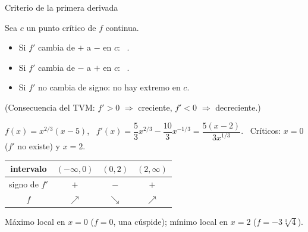 \documentclass[10pt,aspectratio=169]{beamer}
\begin{document}
\begin{frame}{Criterio de la primera derivada}
  \begin{teorema}
    Sea $c$ un punto crítico de $f$ continua.
    \begin{itemize}
      \item Si $f'$ cambia de $+$ a $-$ en $c$: \ .
      \item Si $f'$ cambia de $-$ a $+$ en $c$: \ .
      \item Si $f'$ no cambia de signo: no hay extremo en $c$.
    \end{itemize}
  \end{teorema}
  \small (Consecuencia del TVM: $f'>0$ $\Rightarrow$ creciente, $f'<0$ $\Rightarrow$ decreciente.)
  \normalsize
  \begin{ejemplo}[2]
    $f(x)=x^{2/3}(x-5)$, \ $f'(x)=\dfrac53x^{2/3}-\dfrac{10}{3}x^{-1/3}=\dfrac{5(x-2)}{3x^{1/3}}$. \ Críticos: $x=0$ ($f'$ no existe) y $x=2$.
    \begin{center}
      \begin{tabular}{c|ccc}
        intervalo & $(-\infty,0)$ & $(0,2)$ & $(2,\infty)$\\ \hline
        signo de $f'$ & $+$ & $-$ & $+$\\
        $f$ & $\nearrow$ & $\searrow$ & $\nearrow$
      \end{tabular}
    \end{center}
    Máximo local en $x=0$ ($f=0$, una cúspide); mínimo local en $x=2$ ($f=-3\sqrt[3]4$).
  \end{ejemplo}
\end{frame}
\end{document}
